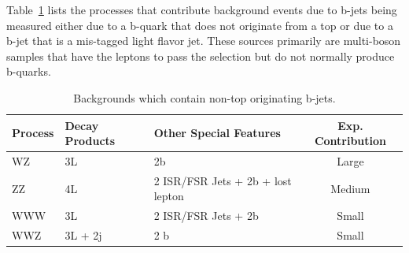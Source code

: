 		Table~\ref{tab:bjet_bkg} lists the processes that contribute background events due to b-jets being measured either due to a b-quark that does not originate from a top or due to a b-jet that is a mis-tagged light flavor jet. These sources primarily are multi-boson samples that have the leptons to pass the selection but do not normally produce b-quarks.

	\begin{table}[hbt]
	\begin{center}
	\begin{tabular}{l|ll|c}\hline\hline %
	Process & Decay Products & Other Special Features & Exp. Contribution\\
	\hline
	WZ & 3L & 2b  & Large\\
	ZZ & 4L & 2 ISR/FSR Jets + 2b + lost lepton & Medium\\
	WWW & 3L & 2 ISR/FSR Jets + 2b& Small\\
	WWZ & 3L + 2j & 2 b & Small\\
	\hline \hline
	\end{tabular}
	\caption{\label{tab:bjet_bkg} Backgrounds which contain non-top originating b-jets.}
	\end{center}
	\end{table}



		

			  
		
			
			
			
			
			
